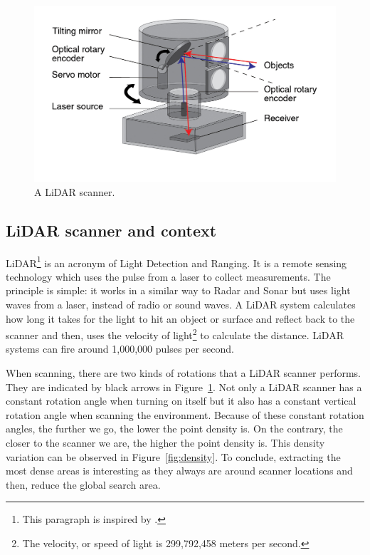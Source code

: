\begin{figure}
  \centering
  \includegraphics[scale=1]{img/lidar.jpg}
  \caption{A LiDAR scanner.}
  \label{fig:lidar}
\end{figure}


\subsection{LiDAR scanner and context}
\label{subsc:lidar}
LiDAR\footnote{This paragraph is inspired by \cite{lidar}.} is an acronym of Light Detection and Ranging. It is a remote sensing technology which uses the pulse from a laser to collect measurements. The principle is simple: it works in a similar way to Radar and Sonar but uses light waves from a laser, instead of radio or sound waves. A LiDAR system calculates how long it takes for the light to hit an object or surface and reflect back to the scanner and then, uses the velocity of light\footnote{The velocity, or speed of light is 299,792,458 meters
per second.} to calculate the distance. LiDAR systems can fire around 1,000,000 pulses per second.

When scanning, there are two kinds of rotations that a LiDAR scanner performs. They are indicated by black arrows in Figure~\ref{fig:lidar}. Not only a LiDAR scanner has a constant rotation angle when turning on itself but it also has a constant vertical rotation angle when scanning the environment. Because of these constant rotation angles, the further we go, the lower the point density is. On the contrary, the closer to the scanner we are, the higher the point density is. This density variation can be observed in
Figure~\ref{fig:density}. To conclude, extracting the most dense areas is interesting as they always are around scanner locations and then, reduce the global search area.

